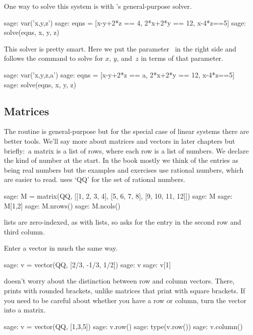 One way to solve this system is with \Sage's general-purpose solver.
\begin{sagecommandline}
sage: var('x,y,z')                                  
sage: eqns = [x-y+2*z == 4, 2*x+2*y == 12, x-4*z==5]
sage: solve(eqns, x, y, z)                            
\end{sagecommandline}
This solver is pretty smart.
Here we put the parameter~ in the right side 
and \Sage{} follows the
command  to 
solve for $x$, $y$, and~$z$ in terms of that parameter.
\begin{sagecommandline}
sage: var('x,y,z,a')                                
sage: eqns = [x-y+2*z == a, 2*x+2*y == 12, x-4*z==5]
sage: solve(eqns, x, y, z) 
\end{sagecommandline}



\subsection{Matrices}
The  routine is general-purpose but 
for the special case of linear systems there are better tools.
We'll say more about matrices and vectors in later chapters but 
briefly:~a \Sage{} matrix is a list of rows, where
each row is a list of numbers. 
We declare the kind of number at the start.
In the book mostly we think of the entries as being real numbers
but the examples and exercises use rational numbers, which are
easier to read.
\Sage{} uses `QQ' for the set of rational numbers.
\begin{sagecommandline}
sage: M = matrix(QQ, [[1, 2, 3, 4], [5, 6, 7, 8], [9, 10, 11, 12]])
sage: M
sage: M[1,2]
sage: M.nrows()
sage: M.ncols()
\end{sagecommandline}
\Sage{} lists are zero-indexed, as with \python{} lists, 
so  asks
for the entry in the second row and third column. 

Enter a vector in much the same way.
\begin{sagecommandline}
sage: v = vector(QQ, [2/3, -1/3, 1/2])
sage: v
sage: v[1]
\end{sagecommandline}
\Sage{} doesn't worry about the distinction between row and column
vectors.
There,  prints with rounded brackets, unlike matrices
that print with square brackets.
If you need to be careful about whether you have a row or column, turn the 
vector into a matrix.
\begin{sagecommandline}
sage: v = vector(QQ, [1,3,5])
sage: v.row()
sage: type(v.row())
sage: v.column()
\end{sagecommandline}

